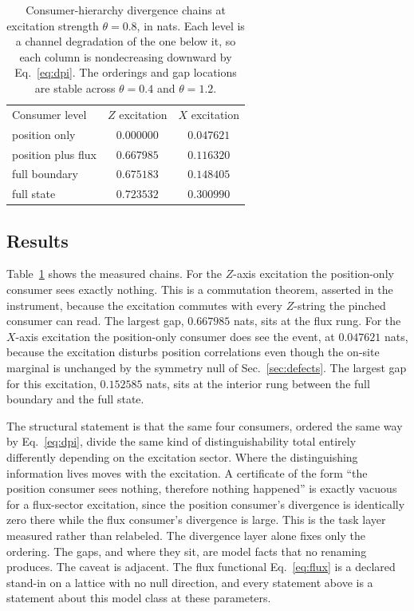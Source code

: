 \documentclass[aps,prd,reprint,nofootinbib,longbibliography]{revtex4-2}
\begin{document}
\begin{table}[t]
\caption{Consumer-hierarchy divergence chains at excitation strength
$\theta=0.8$, in nats.  Each level is a channel degradation of the one
below it, so each column is nondecreasing downward by
Eq.~\eqref{eq:dpi}.  The orderings and gap locations are stable across
$\theta=0.4$ and $\theta=1.2$.}
\label{tab:hierarchy}
\begin{ruledtabular}
\begin{tabular}{lcc}
Consumer level & $Z$ excitation & $X$ excitation \\
\colrule
position only        & $0.000000$ & $0.047621$ \\
position plus flux   & $0.667985$ & $0.116320$ \\
full boundary        & $0.675183$ & $0.148405$ \\
full state           & $0.723532$ & $0.300990$ \\
\end{tabular}
\end{ruledtabular}
\end{table}

\subsection{Results}

Table~\ref{tab:hierarchy} shows the measured chains.  For the $Z$-axis
excitation the position-only consumer sees exactly nothing.  This is a
commutation theorem, asserted in the instrument, because the excitation
commutes with every $Z$-string the pinched consumer can read.  The largest
gap, $0.667985$ nats, sits at the flux rung.  For the $X$-axis excitation
the position-only consumer does see the event, at $0.047621$ nats, because
the excitation disturbs position correlations even though the on-site
marginal is unchanged by the symmetry null of Sec.~\ref{sec:defects}.  The
largest gap for this excitation, $0.152585$ nats, sits at the interior
rung between the full boundary and the full state.

The structural statement is that the same four consumers, ordered the same
way by Eq.~\eqref{eq:dpi}, divide the same kind of distinguishability total
entirely differently depending on the excitation sector.  Where the
distinguishing information lives moves with the excitation.  A certificate
of the form ``the position consumer sees nothing, therefore nothing
happened'' is exactly vacuous for a flux-sector excitation, since the
position consumer's divergence is identically zero there while the flux
consumer's divergence is large.  This is the task layer measured rather
than relabeled.  The divergence layer alone fixes only the ordering.  The
gaps, and where they sit, are model facts that no renaming produces.  The
caveat is adjacent.  The flux functional Eq.~\eqref{eq:flux} is a declared
stand-in on a lattice with no null direction, and every statement above is
a statement about this model class at these parameters.
\end{document}
